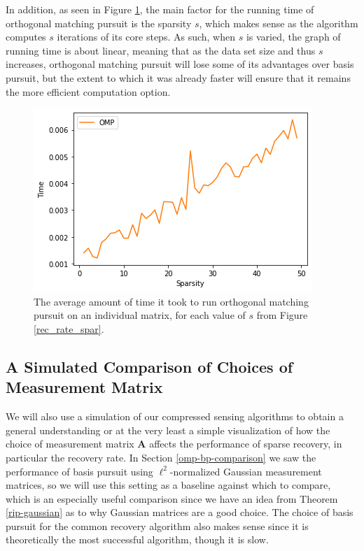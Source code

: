 \documentclass[12pt,a4paper]{amsart}
\numberwithin{equation}{section}
\theoremstyle{plain}
\theoremstyle{definition}
\newcommand{\bdA}{\mathbf{A}}
\begin{document}
In addition, as seen in Figure \ref{omp_time}, the main factor for the running time of orthogonal matching pursuit is the sparsity $s$, which makes sense as the algorithm computes $s$ iterations of its core steps. As such, when $s$ is varied, the graph of running time is about linear, meaning that as the data set size and thus $s$ increases, orthogonal matching pursuit will lose some of its advantages over basis pursuit, but the extent to which it was already faster will ensure that it remains the more efficient computation option.

\begin{figure}
    \centering
    \includegraphics[scale = 0.7]{omp_time_m_constant_final.png}
    \caption{The average amount of time it took to run orthogonal matching pursuit on an individual matrix, for each value of $s$ from Figure \ref{rec_rate_spar}.}
    \label{omp_time}
\end{figure}

\subsection{A Simulated Comparison of Choices of Measurement Matrix}\label{sim-matrix}

We will also use a simulation of our compressed sensing algorithms to obtain a general understanding or at the very least a simple visualization of how the choice of measurement matrix $\bdA$ affects the performance of sparse recovery, in particular the recovery rate. In Section \ref{omp-bp-comparison} we saw the performance of basis pursuit using $\ell^2$-normalized Gaussian measurement matrices, so we will use this setting as a baseline against which to compare, which is an especially useful comparison since we have an idea from Theorem \ref{rip-gaussian} as to why Gaussian matrices are a good choice. The choice of basis pursuit for the common recovery algorithm also makes sense since it is theoretically the most successful algorithm, though it is slow.
\end{document}
